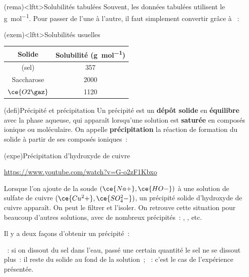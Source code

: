 \documentclass[../../main/main.tex]{subfiles}
\begin{document}
\begin{tcb*}(rema)<lftt>{Solubilités tabulées}
	Souvent, les données tabulées utilisent le \si{g.mol^{-1}}. Pour passer de
	l'une à l'autre, il faut simplement convertir grâce à ~:
	\psw{
		\[
			m\ind{dissout} = M n\ind{dissout}
		\]
	}
	\vspace{-15pt}
\end{tcb*}

\begin{tcb*}(exem)<lftt>{Solubilités usuelles}
	\begin{center}
		\begin{tabular}{cc}
			\toprule
			\textbf{Solide} & \textbf{Solubilité} (\si{g.mol^{-1}})
			\\
			\midrule
			\ce{NaCl} (sel) & \num{357}
			\\
			Saccharose      & \num{2000}
			\\
			$\ce{O2\gaz}$   & \num{1120}
			\\
			\bottomrule
		\end{tabular}
	\end{center}
\end{tcb*}

\begin{tcb*}(defi){Précipité et précipitation}
	Un précipité est un \textbf{dépôt solide} en \textbf{équilibre} avec la phase
	aqueuse, qui apparaît lorsqu'une solution est \textbf{saturée} en composés
	ionique ou moléculaire.
	\smallbreak
	On appelle \textbf{précipitation} la réaction de formation du solide à partir
	de ses composés ioniques~:
	\psw{
		\[
			p \ce{A+}\aqu{} + q \ce{B-}\aqu{} = \ce{A_pB_q\sol{}}
		\]
	}
	\vspace{-15pt}
\end{tcb*}

\begin{tcb*}(expe){Précipitation d'hydroxyde de cuivre}
	\begin{center}
		\url{https://www.youtube.com/watch?v=G-o2zF1Kbxo}
	\end{center}
	Lorsque l'on ajoute de la soude $(\ce{Na+},\ce{HO-})$ à une solution de sulfate
	de cuivre $(\ce{Cu^2+},\ce{SO_4^2-})$, un précipité solide d'hydroxyde de cuivre
	 apparaît. On peut le filtrer et l'isoler.
	\smallbreak
	On retrouve cette situation
	pour beaucoup d'autres solutions, avec de nombreux précipités~: ,
	, etc.
\end{tcb*}

Il y a deux façons d'obtenir un précipité~:
\begin{enumerate}
	~: si on dissout du sel
	dans l'eau, passé une certain quantité le sel ne se dissout plus~: il reste
	du solide au fond de la solution~;
	~: c'est le cas de l'expérience présentée.
\end{enumerate}
\end{document}
